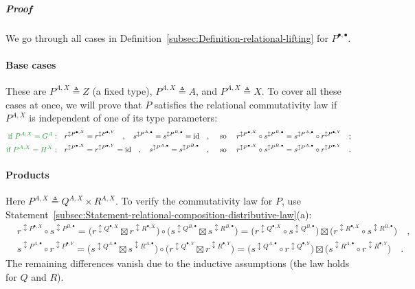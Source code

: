\subparagraph{Proof}

We go through all cases in Definition~\ref{subsec:Definition-relational-lifting}
for $P^{\bullet,\bullet}$.

\paragraph{Base cases}

These are $P^{A,X}\triangleq Z$ (a fixed type), $P^{A,X}\triangleq A$,
and $P^{A,X}\triangleq X$. To cover all these cases at once, we will
prove that $P$ satisfies the relational commutativity law if $P^{A,X}$
is independent of one of its type parameters:
\begin{align*}
{\color{greenunder}\text{if }P^{A,X}=G^{A}:}\quad & r^{\updownarrow P^{\bullet,X}}=r^{\updownarrow P^{\bullet,Y}}\quad,\quad s^{\updownarrow P^{A,\bullet}}=s^{\updownarrow P^{B,\bullet}}=\text{id}\quad,\quad\text{ so }\quad r^{\updownarrow P^{\bullet,X}}\circ s^{\updownarrow P^{B,\bullet}}=s^{\updownarrow P^{A,\bullet}}\circ r^{\updownarrow P^{\bullet,Y}}\quad;\\
{\color{greenunder}\text{if }P^{A,X}=H^{X}:}\quad & r^{\updownarrow P^{\bullet,X}}=r^{\updownarrow P^{\bullet,Y}}=\text{id}\quad,\quad s^{\updownarrow P^{A,\bullet}}=s^{\updownarrow P^{B,\bullet}}\quad,\quad\text{ so }\quad r^{\updownarrow P^{\bullet,X}}\circ s^{\updownarrow P^{B,\bullet}}=s^{\updownarrow P^{A,\bullet}}\circ r^{\updownarrow P^{\bullet,Y}}\quad.
\end{align*}


\paragraph{Products}

Here $P^{A,X}\triangleq Q^{A,X}\times R^{A,X}$. To verify the commutativity
law for $P$, use Statement~\ref{subsec:Statement-relational-composition-distributive-law}(a):
\begin{align*}
 & r^{\updownarrow P^{\bullet,X}}\circ s^{\updownarrow P^{B,\bullet}}=\big(r^{\updownarrow Q^{\bullet,X}}\boxtimes r^{\updownarrow R^{\bullet,X}}\big)\circ\big(s^{\updownarrow Q^{B,\bullet}}\boxtimes s^{\updownarrow R^{B,\bullet}}\big)=\big(r^{\updownarrow Q^{\bullet,X}}\circ s^{\updownarrow Q^{B,\bullet}}\big)\boxtimes\big(r^{\updownarrow R^{\bullet,X}}\circ s^{\updownarrow R^{B,\bullet}}\big)\quad,\\
 & s^{\updownarrow P^{A,\bullet}}\circ r^{\updownarrow P^{\bullet,Y}}=\big(s^{\updownarrow Q^{A,\bullet}}\boxtimes s^{\updownarrow R^{A,\bullet}}\big)\circ\big(r^{\updownarrow Q^{\bullet,Y}}\boxtimes r^{\updownarrow R^{\bullet,Y}}\big)=\big(s^{\updownarrow Q^{A,\bullet}}\circ r^{\updownarrow Q^{\bullet,Y}}\big)\boxtimes\big(s^{\updownarrow R^{A,\bullet}}\circ r^{\updownarrow R^{\bullet,Y}}\big)\quad.
\end{align*}
The remaining differences vanish due to the inductive assumptions
(the law holds for $Q$ and $R$).

